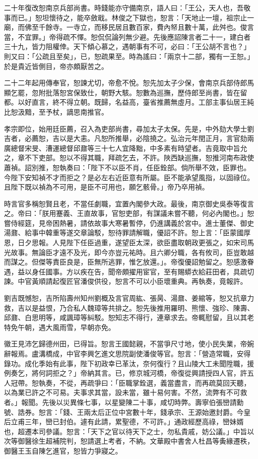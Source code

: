 \begin{pinyinscope}
二十年復改恕南京兵部尚書。時錢能亦守備南京，語人曰：「王公，天人也，吾敬事而已。」恕坦懷待之，能卒斂戢。林俊之下獄也，恕言：「天地止一壇，祖宗止一廟，而佛至千餘寺。一寺立，而移民居且數百家，費內帑且數十萬，此舛也。俊言當，不宜罪。」帝得疏不懌。恕侃侃論列無少避。先後應詔陳言者二十一，建白者三十九，皆力阻權倖。天下傾心慕之，遇朝事有不可，必曰：「王公胡不言也？」則又曰：「公疏且至矣」，已，恕疏果至。時為謠曰：「兩京十二部，獨有一王恕。」於是貴近皆側目，帝亦頗厭苦之。

二十二年起用傳奉官，恕諫尤切，帝愈不悅。恕先加太子少保，會南京兵部侍郎馬顯乞罷，忽附批落恕宮保致仕，朝野大駭。恕數為巡撫，歷侍郎至尚書，皆在留都。以好直言，終不得立朝。既歸，名益高，臺省推薦無虛月。工部主事仙居王純比恕汲黯，至予杖，謫思南推官。

孝宗即位，始用廷臣薦，召入為吏部尚書，尋加太子太保。先是，中外劾大學士劉吉者，必薦恕，吉以是大恚。凡恕所推舉，必陰撓之。弘治元年閏正月，言官劾兩廣總督宋旻、漕運總督邱鼐等三十七人宜降黜，中多素有時望者。吉竟取中旨允之，章不下吏部。恕以不得其職，拜疏乞去，不許。陜西缺巡撫，恕推河南布政使蕭禎。詔別推，恕執奏曰：「陛下不以臣不肖，任臣銓部。倘所舉不效，臣罪也。今陛下安知禎不才而拒之？是必左右近臣意有所屬。臣不能承望風指，以固祿位。且陛下既以禎為不可用，是臣不可用也，願乞骸骨。」帝乃卒用禎。

時言官多稱恕賢且老，不當任劇職，宜置內閣參大政。最後，南京御史吳泰等復言之。帝曰：「朕用蹇義、王直故事，官恕吏部，有謀議未嘗不聽，何必內閣也。」恕嘗侍經筵，見帝困熱暑，請依故事大寒暑暫停，仍進講義於宮中。進士董傑、御史湯鼐、給事中韓重等遂交章論駁，恕待罪請解職，優詔不許。恕上言：「臣蒙國厚恩，日夕思報。人見陛下任臣過重，遂望臣太深，欲臣盡取朝政更張之，如宋司馬光故事。無論臣才遠不及光，即今亦豈元祐時。且六卿分職，各有攸司，臣豈敢越而謀之。但傑等責臣良是，臣無所逃罪，惟乞放還。」。帝復優詔勉留之。恕感激眷遇，益以身任國事。方以疾在告，聞帝頗擢用宦官，至有賜蟒衣給莊田者，具疏切諫。中官黃順請起復匠官潘俊供役，恕言不可以小臣壞重典。再執奏，竟報許。

劉吉既憾恕，吉所陷壽州知州劉概及言官周紘、張昺、湯鼐、姜綰等，恕又抗章力救，吉以是益恨，乃合私人魏璋等共排之。恕先後推用羅明、熊懷、強珍、陳壽、邱鼐、白思明等，咸諷璋等糾駁。恕知志不得行，連章求去。帝輒慰留，且以其老特免午朝，遇大風雨雪，早朝亦免。

徽王見沛乞歸德州田，已得旨。恕言王國懿親，不當爭尺寸地，使小民失業，帝婉辭報焉。盧溝橋成，中官李興乞進文思院副使潘俊等官。恕言：「營造常職，安得錄功。成化季始有此事，陛下初政幸已革汰，奈何復行？且山陵大工未聞陞職，援例奏乞，將何詞拒之？」帝納其言。已，修京城河橋，帝復從興請授四人官，許五人冠帶。恕執奏，不從，再疏爭曰：「臣職掌銓選，義當盡言，而再疏莫回天聽，以為業已許之不可易。夫事求其當，設未當，雖十易何害。不然，流弊有不可救者。」報聞。先後以災異條七事，以星變陳二十事，咸切時弊。壽寧伯張巒請勳號、誥券。恕言：「錢、王兩太后正位中宮數十年，錢承宗、王源始邀封爵。今皇后立甫三年，巒已封伯。遽有此請，累聖德，不可許。」通政經歷高祿，巒妹婿也，超遷本司參議。恕言：「天下之官以待天下之士，勿私貴戚，妨公議。」中旨以次等御醫徐生超補院判，恕請選上考者，不納。文華殿中書舍人杜昌等夤緣遷秩，御醫王玉自陳乞進官，恕皆力爭寢之。


\end{pinyinscope}
